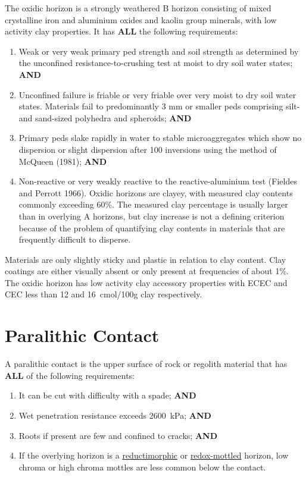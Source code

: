 \documentclass[
  letterpaper,
  DIV=11,
  numbers=noendperiod]{scrreprt}
\providecommand{\tightlist}{%
  \setlength{\itemsep}{0pt}\setlength{\parskip}{0pt}}\usepackage{longtable,booktabs,array}
\begin{document}
The oxidic horizon is a strongly weathered B horizon consisting of mixed
crystalline iron and aluminium oxides and kaolin group minerals, with
low activity clay properties. It has \textbf{ALL} the following
requirements:

\begin{enumerate}
\def\labelenumi{\arabic{enumi}.}
\tightlist
\item
  Weak or very weak primary ped strength and soil strength as determined
  by the unconfined resistance-to-crushing test at moist to dry soil
  water states; \textbf{AND}
\item
  Unconfined failure is friable or very friable over very moist to dry
  soil water states. Materials fail to predominantly 3 mm or smaller
  peds comprising silt- and sand-sized polyhedra and spheroids;
  \textbf{AND}
\item
  Primary peds slake rapidly in water to stable microaggregates which
  show no dispersion or slight dispersion after 100 inversions using the
  method of McQueen (1981); \textbf{AND}
\item
  Non-reactive or very weakly reactive to the reactive-aluminium test
  (Fieldes and Perrott 1966). Oxidic horizons are clayey, with measured
  clay contents commonly exceeding 60\%. The measured clay percentage is
  usually larger than in overlying A horizons, but clay increase is not
  a defining criterion because of the problem of quantifying clay
  contents in materials that are frequently difficult to disperse.
\end{enumerate}

Materials are only slightly sticky and plastic in relation to clay
content. Clay coatings are either visually absent or only present at
frequencies of about 1\%. The oxidic horizon has low activity clay
accessory properties with ECEC and CEC less than 12 and 16~cmol/100g
clay respectively.

\hypertarget{sec-diag-plith}{%
\section{Paralithic Contact}\label{sec-diag-plith}}

A paralithic contact is the upper surface of rock or regolith material
that has \textbf{ALL} of the following requirements:

\begin{enumerate}
\def\labelenumi{\arabic{enumi}.}
\tightlist
\item
  It can be cut with difficulty with a spade; \textbf{AND}
\item
  Wet penetration resistance exceeds 2600~kPa; \textbf{AND}
\item
  Roots if present are few and confined to cracks; \textbf{AND}
\item
  If the overlying horizon is a
  \protect\hyperlink{sec-diag-redmh}{reductimorphic} or
  \protect\hyperlink{sec-diag-roxh}{redox-mottled} horizon, low chroma
  or high chroma mottles are less common below the contact.
\end{enumerate}
\end{document}

